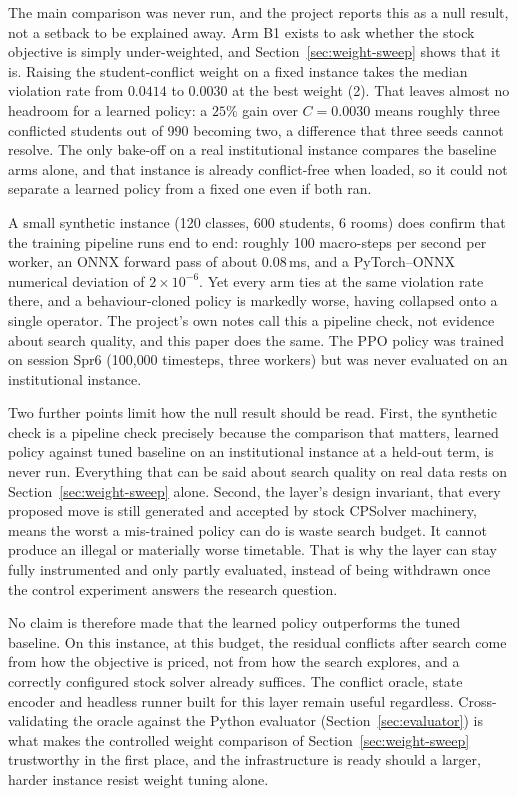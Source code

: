 \documentclass[journal]{IEEEtran}
\begin{document}
The main comparison was never run, and the project reports this as a null result, not a setback to be explained away. Arm B1 exists to ask whether the stock objective is simply under-weighted, and Section~\ref{sec:weight-sweep} shows that it is. Raising the student-conflict weight on a fixed instance takes the median violation rate from $0.0414$ to $0.0030$ at the best weight (2). That leaves almost no headroom for a learned policy: a $25\%$ gain over $C=0.0030$ means roughly three conflicted students out of 990 becoming two, a difference that three seeds cannot resolve. The only bake-off on a real institutional instance compares the baseline arms alone, and that instance is already conflict-free when loaded, so it could not separate a learned policy from a fixed one even if both ran.

A small synthetic instance (120 classes, 600 students, 6 rooms) does confirm that the training pipeline runs end to end: roughly 100 macro-steps per second per worker, an ONNX forward pass of about 0.08\,ms, and a PyTorch--ONNX numerical deviation of $2\times10^{-6}$. Yet every arm ties at the same violation rate there, and a behaviour-cloned policy is markedly worse, having collapsed onto a single operator. The project's own notes call this a pipeline check, not evidence about search quality, and this paper does the same. The PPO policy was trained on session Spr6 (100{,}000 timesteps, three workers) but was never evaluated on an institutional instance.

Two further points limit how the null result should be read. First, the synthetic check is a pipeline check precisely because the comparison that matters, learned policy against tuned baseline on an institutional instance at a held-out term, is never run. Everything that can be said about search quality on real data rests on Section~\ref{sec:weight-sweep} alone. Second, the layer's design invariant, that every proposed move is still generated and accepted by stock CPSolver machinery, means the worst a mis-trained policy can do is waste search budget. It cannot produce an illegal or materially worse timetable. That is why the layer can stay fully instrumented and only partly evaluated, instead of being withdrawn once the control experiment answers the research question.

No claim is therefore made that the learned policy outperforms the tuned baseline. On this instance, at this budget, the residual conflicts after search come from how the objective is priced, not from how the search explores, and a correctly configured stock solver already suffices. The conflict oracle, state encoder and headless runner built for this layer remain useful regardless. Cross-validating the oracle against the Python evaluator (Section~\ref{sec:evaluator}) is what makes the controlled weight comparison of Section~\ref{sec:weight-sweep} trustworthy in the first place, and the infrastructure is ready should a larger, harder instance resist weight tuning alone.
\end{document}

